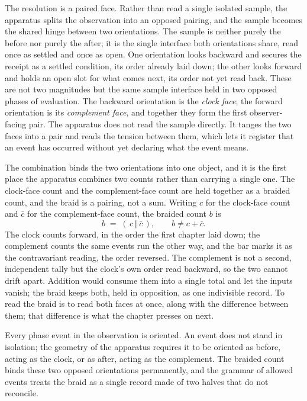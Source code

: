 The resolution is a paired face. Rather than read a single isolated sample, the apparatus splits the observation into an opposed pairing, and the sample becomes the shared hinge between two orientations. The sample is neither purely the before nor purely the after; it is the single interface both orientations share, read once as settled and once as open. One orientation looks backward and secures the receipt as a settled condition, its order already laid down; the other looks forward and holds an open slot for what comes next, its order not yet read back. These are not two magnitudes but the same sample interface held in two opposed phases of evaluation. The backward orientation is the \textit{clock face}; the forward orientation is its \textit{complement face}, and together they form the first observer-facing pair. The apparatus does not read the sample directly. It tanges the two faces into a pair and reads the tension between them, which lets it register that an event has occurred without yet declaring what the event means.

The combination binds the two orientations into one object, and it is the first place the apparatus combines two counts rather than carrying a single one. The clock-face count and the complement-face count are held together as a braided count, and the braid is a pairing, not a sum. Writing $c$ for the clock-face count and $\bar c$ for the complement-face count, the braided count $b$ is
\[ b \;=\; (\,c \,\Vert\, \bar c\,), \qquad b \neq c + \bar c . \]
The clock counts forward, in the order the first chapter laid down; the complement counts the same events run the other way, and the bar marks it as the contravariant reading, the order reversed. The complement is not a second, independent tally but the clock's own order read backward, so the two cannot drift apart. Addition would consume them into a single total and let the inputs vanish; the braid keeps both, held in opposition, as one indivisible record. To read the braid is to read both faces at once, along with the difference between them; that difference is what the chapter presses on next. 

Every phase event in the observation is oriented. An event does not stand in isolation; the geometry of the apparatus requires it to be oriented as before, acting as the clock, or as after, acting as the complement. The braided count binds these two opposed orientations permanently, and the grammar of allowed events treats the braid as a single record made of two halves that do not reconcile.

